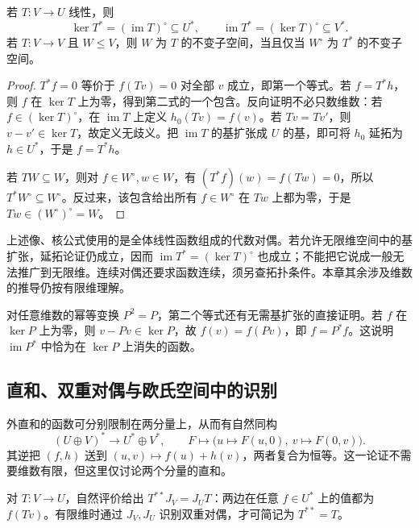 \begin{theorem}
\label{thm:laex-dual-image-kernel}
若 $T:V\to U$ 线性，则
\begin{equation}
 \ker T^*=(\operatorname{im}T)^\circ\subseteq U^*,\qquad
 \operatorname{im}T^*=(\ker T)^\circ\subseteq V^*.
 \label{eq:laex-dual-image-kernel}
\end{equation}
若 $T:V\to V$ 且 $W\le V$，则 $W$ 为 $T$ 的不变子空间，当且仅当 $W^\circ$ 为 $T^*$ 的不变子空间。
\end{theorem}
\begin{proof}
$T^*f=0$ 等价于 $f(Tv)=0$ 对全部 $v$ 成立，即第一个等式。若 $f=T^*h$，则 $f$ 在 $\ker T$ 上为零，得到第二式的一个包含。反向证明不必只数维数：若 $f\in(\ker T)^\circ$，在 $\operatorname{im}T$ 上定义 $h_0(Tv)=f(v)$。若 $Tv=Tv'$，则 $v-v'\in\ker T$，故定义无歧义。把 $\operatorname{im}T$ 的基扩张成 $U$ 的基，即可将 $h_0$ 延拓为 $h\in U^*$，于是 $f=T^*h$。

若 $TW\subseteq W$，则对 $f\in W^\circ,w\in W$，有 $(T^*f)(w)=f(Tw)=0$，所以 $T^*W^\circ\subseteq W^\circ$。反过来，该包含给出所有 $f\in W^\circ$ 在 $Tw$ 上都为零，于是 $Tw\in(W^\circ)^\circ=W$。
\end{proof}

\begin{notealert}[type=caution,title={代数对偶与无限维条件}]
上述像、核公式使用的是全体线性函数组成的代数对偶。若允许无限维空间中的基扩张，延拓论证仍成立，因而 $\operatorname{im}T^*=(\ker T)^\circ$ 也成立；不能把它说成一般无法推广到无限维。连续对偶还要求函数连续，须另查拓扑条件。本章其余涉及维数的推导仍按有限维理解。
\end{notealert}

对任意维数的幂等变换 $P^2=P$，第二个等式还有无需基扩张的直接证明。若 $f$ 在 $\ker P$ 上为零，则 $v-Pv\in\ker P$，故 $f(v)=f(Pv)$，即 $f=P^*f$。这说明 $\operatorname{im}P^*$ 中恰为在 $\ker P$ 上消失的函数。

\subsection{直和、双重对偶与欧氏空间中的识别}

外直和的函数可分别限制在两分量上，从而有自然同构
\[
 (U\oplus V)^*\longrightarrow U^*\oplus V^*,\qquad
 F\longmapsto\bigl(u\mapsto F(u,0),\ v\mapsto F(0,v)\bigr).
\]
其逆把 $(f,h)$ 送到 $(u,v)\mapsto f(u)+h(v)$，两者复合为恒等。这一论证不需要维数有限，但这里仅讨论两个分量的直和。

对 $T:V\to U$，自然评价给出 $T^{**}J_V=J_UT$：两边在任意 $f\in U^*$ 上的值都为 $f(Tv)$。有限维时通过 $J_V,J_U$ 识别双重对偶，才可简记为 $T^{**}=T$。

